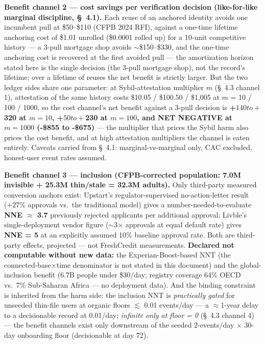 \documentclass[
]{article}
\begin{document}
\textbf{Benefit channel 2 --- cost savings per verification decision
(like-for-like marginal discipline, §~4.1).} Each reuse of an anchored
identity avoids one incumbent pull at \$50--\$110 (CFPB 2024 RFI),
against a one-time lifetime anchoring cost of \$1.01 unrolled (\$0.0001
rolled up) for a 10-unit competitive history --- a 3-pull mortgage shop
avoids \(\sim\)\$150--\$330, and the one-time anchoring cost is
recovered at the first avoided pull --- the amortization horizon stated
here is the single decision (the 3-pull mortgage shop), not the record's
lifetime; over a lifetime of reuses the net benefit is strictly larger.
But the two ledger sides share one parameter: at Sybil-attestation
multiplier \(m\) (§~4.3 channel 1), attestation of the same history
costs \$10.05 / \$100.50 / \$1,005 at \(m\) = 10 / 100 / 1000, so the
cost channel's net benefit against a 3-pull decision is
\textbf{+\(140 to +\)320 at \(m = 10\), +\(50 to +\)230 at \(m = 100\),
and NET NEGATIVE at \(m = 1000\) (-\$855 to -\$675)} --- the multiplier
that prices the Sybil harm also prices the cost benefit, and at high
attestation multipliers the channel is eaten entirely. Caveats carried
from §~4.1: marginal-vs-marginal only, CAC excluded, honest-user event
rates assumed.

\textbf{Benefit channel 3 --- inclusion (CFPB-corrected population: 7.0M
invisible + 25.3M thin/stale = 32.3M adults).} Only third-party measured
conversion anchors exist: Upstart's regulator-supervised
no-action-letter result (+27\% approvals vs.~the traditional model)
gives a number-needed-to-evaluate \textbf{NNE \(\approx\) 3.7}
previously rejected applicants per additional approval; Livble's
single-deployment vendor figure (\(\sim\)3\(\times\) approvals at equal
default rate) gives \textbf{NNE = 5} at an explicitly assumed 10\%
baseline approval rate. Both are third-party effects, projected --- not
FreshCredit measurements. \textbf{Declared not computable without new
data:} the Experian-Boost-based NNT (the connected-base\(\times\)time
denominator is not stated in this document) and the global-inclusion
benefit (6.7B people under \$30/day; registry coverage 64\% OECD vs.~7\%
Sub-Saharan Africa --- no deployment data). And the binding constraint
is inherited from the harm side: the inclusion NNT is \emph{practically
gated} for unseeded thin-file users at organic floors \(\lesssim\) 0.01
events/day --- a \(\approx\)1-year delay to a decisionable record at
0.01/day; \emph{infinite only at floor = 0} (§~4.3 channel 4) --- the
benefit channels exist only downstream of the seeded 2-events/day
\(\times\) 30-day onboarding floor (decisionable at day 72).
\end{document}
